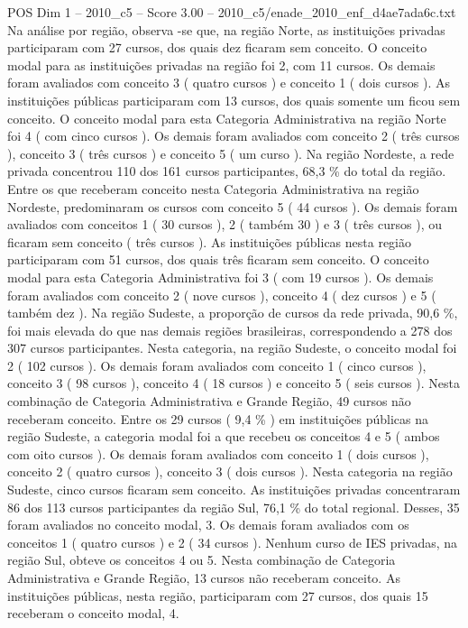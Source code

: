 \begin{textsample}{POS Dim 1 – 2010\_c5 – Score 3.00 – 2010\_c5/enade\_2010\_enf\_d4ae7ada6c.txt}
Na análise por região, observa -se que, na região Norte, as instituições privadas participaram com 27 cursos, dos quais dez ficaram sem conceito.
O conceito modal para as instituições privadas na região foi 2, com 11 cursos.
Os demais foram avaliados com conceito 3 ( quatro cursos ) e conceito 1 ( dois cursos ).
As instituições públicas participaram com 13 cursos, dos quais somente um ficou sem conceito.
O conceito modal para esta Categoria Administrativa na região Norte foi 4 ( com cinco cursos ).
Os demais foram avaliados com conceito 2 ( três cursos ), conceito 3 ( três cursos ) e conceito 5 ( um curso ).
Na região Nordeste, a rede privada concentrou 110 dos 161 cursos participantes, 68,3 \% do total da região.
Entre os que receberam conceito nesta Categoria Administrativa na região Nordeste, predominaram os cursos com conceito 5 ( 44 cursos ).
Os demais foram avaliados com conceitos 1 ( 30 cursos ), 2 ( também 30 ) e 3 ( três cursos ), ou ficaram sem conceito ( três cursos ).
As instituições públicas nesta região participaram com 51 cursos, dos quais três ficaram sem conceito.
O conceito modal para esta Categoria Administrativa foi 3 ( com 19 cursos ).
Os demais foram avaliados com conceito 2 ( nove cursos ), conceito 4 ( dez cursos ) e 5 ( também dez ).
Na região Sudeste, a proporção de cursos da rede privada, 90,6 \%, foi mais elevada do que nas demais regiões brasileiras, correspondendo a 278 dos 307 cursos participantes.
Nesta categoria, na região Sudeste, o conceito modal foi 2 ( 102 cursos ).
Os demais foram avaliados com conceito 1 ( cinco cursos ), conceito 3 ( 98 cursos ), conceito 4 ( 18 cursos ) e conceito 5 ( seis cursos ).
Nesta combinação de Categoria Administrativa e Grande Região, 49 cursos não receberam conceito.
Entre os 29 cursos ( 9,4 \% ) em instituições públicas na região Sudeste, a categoria modal foi a que recebeu os conceitos 4 e 5 ( ambos com oito cursos ).
Os demais foram avaliados com conceito 1 ( dois cursos ), conceito 2 ( quatro cursos ), conceito 3 ( dois cursos ).
Nesta categoria na região Sudeste, cinco cursos ficaram sem conceito.
As instituições privadas concentraram 86 dos 113 cursos participantes da região Sul, 76,1 \% do total regional.
Desses, 35 foram avaliados no conceito modal, 3.
Os demais foram avaliados com os conceitos 1 ( quatro cursos ) e 2 ( 34 cursos ).
Nenhum curso de IES privadas, na região Sul, obteve os conceitos 4 ou 5.
Nesta combinação de Categoria Administrativa e Grande Região, 13 cursos não receberam conceito.
As instituições públicas, nesta região, participaram com 27 cursos, dos quais 15 receberam o conceito modal, 4.

\end{textsample}
